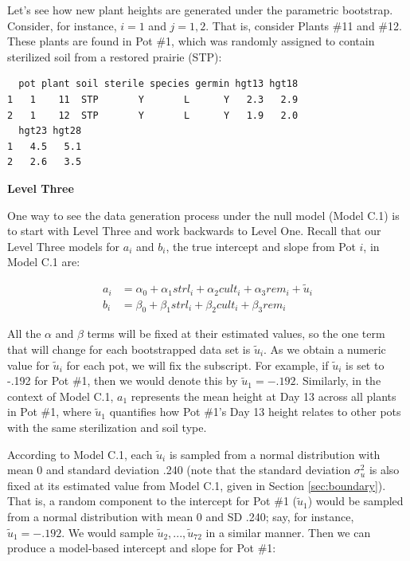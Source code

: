 \documentclass[
]{krantz}
\begin{document}
Let's see how new plant heights are generated under the parametric bootstrap. Consider, for instance, \(i=1\) and \(j=1,2\). That is, consider Plants \#11 and \#12. These plants are found in Pot \#1, which was randomly assigned to contain sterilized soil from a restored prairie (STP):

\begin{verbatim}
  pot plant soil sterile species germin hgt13 hgt18
1   1    11  STP       Y       L      Y   2.3   2.9
2   1    12  STP       Y       L      Y   1.9   2.0
  hgt23 hgt28
1   4.5   5.1
2   2.6   3.5
\end{verbatim}

\textbf{Level Three}

One way to see the data generation process under the null model (Model C.1) is to start with Level Three and work backwards to Level One. Recall that our Level Three models for \(a_{i}\) and \(b_{i}\), the true intercept and slope from Pot \(i\), in Model C.1 are:

\begin{align*}
a_{i} & = \alpha_{0}+\alpha_{1}\textstyle{strl}_{i}+\alpha_{2}\textstyle{cult}_{i}+\alpha_{3}\textstyle{rem}_{i}+\tilde{u}_{i} \\
b_{i} & = \beta_{0}+\beta_{1}\textstyle{strl}_{i}+\beta_{2}\textstyle{cult}_{i}+\beta_{3}\textstyle{rem}_{i}
\end{align*}

All the \(\alpha\) and \(\beta\) terms will be fixed at their estimated values, so the one term that will change for each bootstrapped data set is \(\tilde{u}_{i}\). As we obtain a numeric value for \(\tilde{u}_{i}\) for each pot, we will fix the subscript. For example, if \(\tilde{u}_{i}\) is set to -.192 for Pot \#1, then we would denote this by \(\tilde{u}_{1}=-.192\). Similarly, in the context of Model C.1, \(a_{1}\) represents the mean height at Day 13 across all plants in Pot \#1, where \(\tilde{u}_{1}\) quantifies how Pot \#1's Day 13 height relates to other pots with the same sterilization and soil type.

According to Model C.1, each \(\tilde{u}_{i}\) is sampled from a normal distribution with mean 0 and standard deviation .240 (note that the standard deviation \(\sigma^2_{u}\) is also fixed at its estimated value from Model C.1, given in Section \ref{sec:boundary}). That is, a random component to the intercept for Pot \#1 (\(\tilde{u}_{1}\)) would be sampled from a normal distribution with mean 0 and SD .240; say, for instance, \(\tilde{u}_{1}=-.192\). We would sample \(\tilde{u}_{2},...,\tilde{u}_{72}\) in a similar manner. Then we can produce a model-based intercept and slope for Pot \#1:
\end{document}

